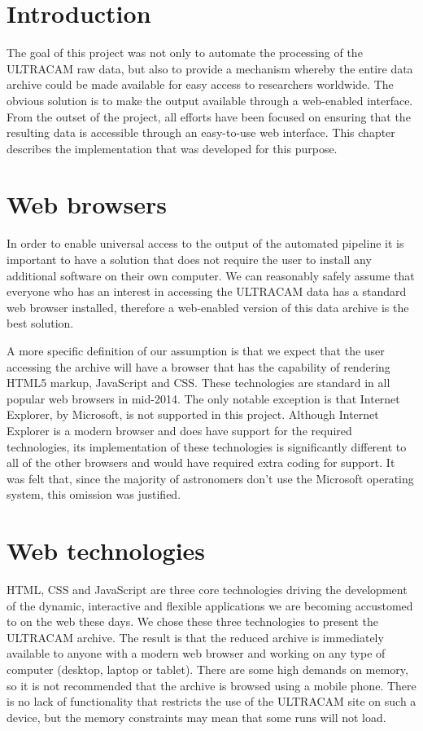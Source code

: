 \section{Introduction} 
The goal of this project was not only to automate the processing of the ULTRACAM raw data, but also to provide a mechanism whereby the entire data archive could be made available for easy access to researchers worldwide. The obvious solution is to make the output available through a web-enabled interface. From the outset of the project, all efforts have been focused on ensuring that the resulting data is accessible through an easy-to-use web interface. This chapter describes the implementation that was developed for this purpose. 

\section{Web browsers}
In order to enable universal access to the output of the automated pipeline it is important to have a solution that does not require the user to install any additional software on their own computer. We can reasonably safely assume that everyone who has an interest in accessing the ULTRACAM data has a standard web browser installed, therefore a web-enabled version of this data archive is the best solution. 

A more specific definition of our assumption is that we expect that the user accessing the archive will have a browser that has the capability of rendering HTML5 markup, JavaScript and CSS. These technologies are standard in all popular web browsers in mid-2014. The only notable exception is that Internet Explorer, by Microsoft, is not supported in this project. Although Internet Explorer is a modern browser and does have support for the required technologies, its implementation of these technologies is significantly different to all of the other browsers and would have required extra coding for support. It was felt that, since the majority of astronomers don't use the Microsoft operating system, this omission was justified.  

\section{Web technologies}
HTML, CSS and JavaScript are three core technologies driving the development of the dynamic, interactive and flexible applications we are becoming accustomed to on the web these days. We chose these three technologies to present the ULTRACAM archive. The result is that the reduced archive is immediately available to anyone with a modern web browser and working on any type of computer (desktop, laptop or tablet). There are some high demands on memory, so it is not recommended that the archive is browsed using a mobile phone. There is no lack of functionality that restricts the use of the ULTRACAM site on such a device, but the memory constraints may mean that some runs will not load.  

